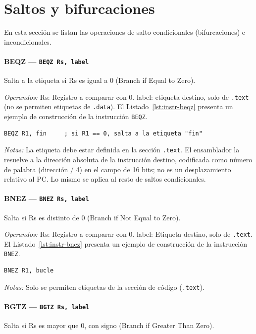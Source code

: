\documentclass[../main.tex]{subfiles}
\begin{document}
\section{Saltos y bifurcaciones}

En esta sección se listan las operaciones de salto condicionales (bifurcaciones) e incondicionales.

\paragraph*{BEQZ --- \texttt{BEQZ Rs, label}}
Salta a la etiqueta si Rs es igual a 0 (Branch if Equal to Zero).

\textit{Operandos:} Rs: Registro a comparar con 0. label: etiqueta destino, solo de \texttt{.text} (no se permiten etiquetas de \texttt{.data}).
El Listado~\ref{lst:instr-beqz} presenta un ejemplo de construcción de la instrucción \texttt{BEQZ}.

\begin{lstlisting}[caption={BEQZ},label={lst:instr-beqz}]
	BEQZ R1, fin     ; si R1 == 0, salta a la etiqueta "fin"
\end{lstlisting}
\textit{Notas:} La etiqueta debe estar definida en la sección \texttt{.text}. El ensamblador la resuelve a la dirección absoluta de la instrucción destino, codificada como número de palabra (dirección / 4) en el campo de 16 bits; no es un desplazamiento relativo al PC. Lo mismo se aplica al resto de saltos condicionales.

\paragraph*{BNEZ --- \texttt{BNEZ Rs, label}}
Salta si Rs es distinto de 0 (Branch if Not Equal to Zero).

\textit{Operandos:} Rs: Registro a comparar con 0. label: Etiqueta destino, solo de \texttt{.text}.
El Listado~\ref{lst:instr-bnez} presenta un ejemplo de construcción de la instrucción \texttt{BNEZ}.

\begin{lstlisting}[caption={BNEZ},label={lst:instr-bnez}]
	BNEZ R1, bucle
\end{lstlisting}
\textit{Notas:} Solo se permiten etiquetas de la sección de código (\texttt{.text}).

\paragraph*{BGTZ --- \texttt{BGTZ Rs, label}}
Salta si Rs es mayor que 0, con signo (Branch if Greater Than Zero).
\end{document}
